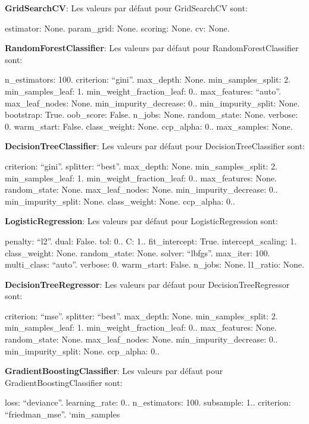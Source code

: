 {\bfseries Grid\+Search\+CV}\+: Les valeurs par défaut pour Grid\+Search\+CV sont\+:

estimator\+: None. param\+\_\+grid\+: None. scoring\+: None. cv\+: None.

{\bfseries Random\+Forest\+Classifier}\+: Les valeurs par défaut pour Random\+Forest\+Classifier sont\+:

n\+\_\+estimators\+: 100. criterion\+: “gini”. max\+\_\+depth\+: None. min\+\_\+samples\+\_\+split\+: 2. min\+\_\+samples\+\_\+leaf\+: 1. min\+\_\+weight\+\_\+fraction\+\_\+leaf\+: 0.. max\+\_\+features\+: “auto”. max\+\_\+leaf\+\_\+nodes\+: None. min\+\_\+impurity\+\_\+decrease\+: 0.. min\+\_\+impurity\+\_\+split\+: None. bootstrap\+: True. oob\+\_\+score\+: False. n\+\_\+jobs\+: None. random\+\_\+state\+: None. verbose\+: 0. warm\+\_\+start\+: False. class\+\_\+weight\+: None. ccp\+\_\+alpha\+: 0.. max\+\_\+samples\+: None.

{\bfseries Decision\+Tree\+Classifier}\+: Les valeurs par défaut pour Decision\+Tree\+Classifier sont\+:

criterion\+: “gini”. splitter\+: “best”. max\+\_\+depth\+: None. min\+\_\+samples\+\_\+split\+: 2. min\+\_\+samples\+\_\+leaf\+: 1. min\+\_\+weight\+\_\+fraction\+\_\+leaf\+: 0.. max\+\_\+features\+: None. random\+\_\+state\+: None. max\+\_\+leaf\+\_\+nodes\+: None. min\+\_\+impurity\+\_\+decrease\+: 0.. min\+\_\+impurity\+\_\+split\+: None. class\+\_\+weight\+: None. ccp\+\_\+alpha\+: 0..

{\bfseries Logistic\+Regression}\+: Les valeurs par défaut pour Logistic\+Regression sont\+:

penalty\+: “l2”. dual\+: False. tol\+: 0.. C\+: 1.. fit\+\_\+intercept\+: True. intercept\+\_\+scaling\+: 1. class\+\_\+weight\+: None. random\+\_\+state\+: None. solver\+: “lbfgs”. max\+\_\+iter\+: 100. multi\+\_\+class\+: “auto”. verbose\+: 0. warm\+\_\+start\+: False. n\+\_\+jobs\+: None. l1\+\_\+ratio\+: None.

{\bfseries Decision\+Tree\+Regressor}\+: Les valeurs par défaut pour Decision\+Tree\+Regressor sont\+:

criterion\+: “mse”. splitter\+: “best”. max\+\_\+depth\+: None. min\+\_\+samples\+\_\+split\+: 2. min\+\_\+samples\+\_\+leaf\+: 1. min\+\_\+weight\+\_\+fraction\+\_\+leaf\+: 0.. max\+\_\+features\+: None. random\+\_\+state\+: None. max\+\_\+leaf\+\_\+nodes\+: None. min\+\_\+impurity\+\_\+decrease\+: 0.. min\+\_\+impurity\+\_\+split\+: None. ccp\+\_\+alpha\+: 0..

{\bfseries Gradient\+Boosting\+Classifier}\+: Les valeurs par défaut pour Gradient\+Boosting\+Classifier sont\+:

loss\+: “deviance”. learning\+\_\+rate\+: 0.. n\+\_\+estimators\+: 100. subsample\+: 1.. criterion\+: “friedman\+\_\+mse”. `min\+\_\+samples 